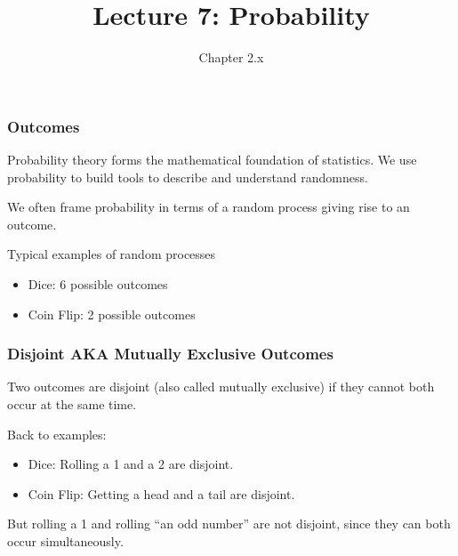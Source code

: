 \documentclass[handout]{beamer}
\title{Lecture 7: Probability}
\author{Chapter 2.x}
\date{}
\newcommand{\blue}[1]{\textcolor{blue2}{#1}}
\begin{document}
\begin{frame}
\titlepage
\end{frame}


\begin{frame}[fragile]
\frametitle{Outcomes}
Probability theory forms the mathematical foundation of statistics.  We use probability to build tools to describe and understand randomness.

\vspace{0.25cm}

We often frame probability in terms of a \blue{random process} giving rise to an \blue{outcome}.  

\vspace{0.25cm}

\pause Typical examples of random processes
\begin{itemize}
\pause \item Dice: 6 possible outcomes
\pause \item Coin Flip: 2 possible outcomes
\end{itemize}

\end{frame}


\begin{frame}[fragile]
\frametitle{Disjoint AKA Mutually Exclusive Outcomes}
Two outcomes are \blue{disjoint (also called mutually exclusive)} if they cannot both occur at the same time.  

\vspace{0.5cm}

\pause Back to examples:
\begin{itemize}
\pause\item Dice: Rolling a 1 and a 2 are disjoint.  
\pause\item Coin Flip: Getting a head and a tail are disjoint.
\end{itemize}

\vspace{0.5cm}

\pause But rolling a 1 and rolling ``an odd number'' are not disjoint, since they can both occur simultaneously.

\end{frame}
\end{document}
